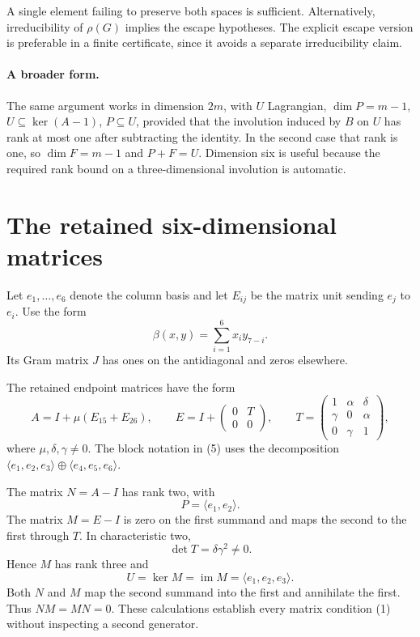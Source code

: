 \documentclass[11pt]{article}
\newcommand{\im}{\operatorname{im}}
\begin{document}
A single element failing to preserve both spaces is sufficient.
Alternatively, irreducibility of \(\rho(G)\) implies the escape
hypotheses. The explicit escape version is preferable in a finite
certificate, since it avoids a separate irreducibility claim.

\paragraph{A broader form.}
The same argument works in dimension \(2m\), with \(U\) Lagrangian,
\(\dim P=m-1\), \(U\subseteq\ker(A-1)\), \(P\subseteq U\),
provided that the involution induced by \(B\) on \(U\) has rank at most
one after subtracting the identity. In the second case that rank
is one, so \(\dim F=m-1\) and \(P+F=U\).
Dimension six is useful because the required rank bound on a
three-dimensional involution is automatic.

\section*{The retained six-dimensional matrices}

Let \(e_1,\ldots,e_6\) denote the column basis and let
\(E_{ij}\) be the matrix unit sending \(e_j\) to \(e_i\).
Use the form
\[
             \beta(x,y)=\sum_{i=1}^6 x_i y_{7-i}.       \tag{4}
\]
Its Gram matrix \(J\) has ones on the antidiagonal and zeros elsewhere.

The retained endpoint matrices have the form
\[
 A=I+\mu(E_{15}+E_{26}),\qquad
 E=I+\begin{pmatrix}0&T\\0&0\end{pmatrix},\qquad
 T=\begin{pmatrix}
        1&\alpha&\delta\\
        \gamma&0&\alpha\\
        0&\gamma&1
    \end{pmatrix},                                  \tag{5}
\]
where \(\mu,\delta,\gamma\ne0\).
The block notation in (5) uses the decomposition
\(\langle e_1,e_2,e_3\rangle\oplus
 \langle e_4,e_5,e_6\rangle\).

The matrix \(N=A-I\) has rank two, with
\[
          P=\langle e_1,e_2\rangle.
\]
The matrix \(M=E-I\) is zero on the first summand and maps the second
to the first through \(T\). In characteristic two,
\[
                    \det T=\delta\gamma^2\ne0.
\]
Hence \(M\) has rank three and
\[
       U=\ker M=\im M=\langle e_1,e_2,e_3\rangle.
\]
Both \(N\) and \(M\) map the second summand into the first and
annihilate the first. Thus \(NM=MN=0\).
These calculations establish every matrix condition (1)
without inspecting a second generator.
\end{document}
